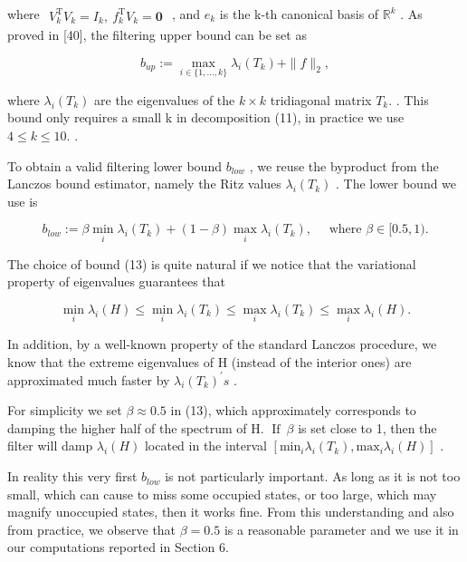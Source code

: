 \documentclass[
  10
]{article}
\begin{document}
where
\(\begin{array} { r } { V _ { k } ^ { \mathrm { T } } V _ { k } = I _ { k } , \ f _ { k } ^ { \mathrm { T } } V _ { k } = \mathbf { 0 } } \end{array}\)
, and \(e _ { k }\) is the k-th canonical basis of
\(\mathbb { R } ^ { k }\) . As proved in {[}40{]}, the filtering upper
bound can be set as

\[
b _ {u p} := \max _ {i \in \{1, \dots , k \}} \lambda_ {i} (T _ {k}) + \| f \| _ {2}, \tag {12}
\]

where \(\lambda _ { i } ( T _ { k } )\) are the eigenvalues of the
\(k \times k\) tridiagonal matrix \(T _ { k } .\) . This bound only
requires a small k in decomposition (11), in practice we use
\(4 \leq k \leq 1 0 .\) .

To obtain a valid filtering lower bound \(b _ { l o w }\) , we reuse the
byproduct from the Lanczos bound estimator, namely the Ritz values
\(\lambda _ { i } ( T _ { k } )\) . The lower bound we use is

\[
b _ {l o w} := \beta \min _ {i} \lambda_ {i} (T _ {k}) + (1 - \beta) \max _ {i} \lambda_ {i} (T _ {k}), \quad \text { where } \beta \in [ 0. 5, 1). \tag {13}
\]

The choice of bound (13) is quite natural if we notice that the
variational property of eigenvalues guarantees that

\[
\min _ {i} \lambda_ {i} (H) \leq \min _ {i} \lambda_ {i} (T _ {k}) \leq \max _ {i} \lambda_ {i} (T _ {k}) \leq \max _ {i} \lambda_ {i} (H). \tag {14}
\]

In addition, by a well-known property of the standard Lanczos procedure,
we know that the extreme eigenvalues of H (instead of the interior ones)
are approximated much faster by
\(\lambda _ { i } ( T _ { k } ) ^ { \prime } s\) .

For simplicity we set \(\beta \approx 0 . 5\) in (13), which
approximately corresponds to damping the higher half of the spectrum of
H. \(\operatorname { I f } \ \beta\) is set close to 1, then the filter
will damp \(\lambda _ { i } ( H )\) located in the interval
\([ \mathrm { m i n } _ { i } \lambda _ { i } ( T _ { k } ) , \mathrm { m a x } _ { i } \lambda _ { i } ( H ) ]\)
.

In reality this very first \(b _ { l o w }\) is not particularly
important. As long as it is not too small, which can cause to miss some
occupied states, or too large, which may magnify unoccupied states, then
it works fine. From this understanding and also from practice, we
observe that \(\beta = 0 . 5\) is a reasonable parameter and we use it
in our computations reported in Section 6.
\end{document}
